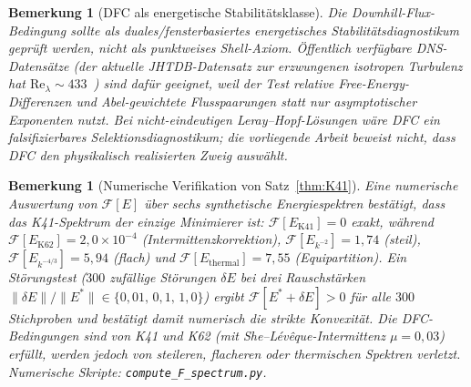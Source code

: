 \documentclass[12pt,a4paper]{article}
\theoremstyle{breakdef}
\theoremstyle{breakplain}
\theoremstyle{breakdef}
\newtheorem{remark}[definition]{Bemerkung}
\begin{document}
\begin{remark}[DFC als energetische Stabilitätsklasse]\label{rem:dfc-stability}
Die Downhill-Flux-Bedingung sollte als duales/fensterbasiertes
energetisches Stabilitätsdiagnostikum geprüft werden, nicht als
punktweises Shell-Axiom. Öffentlich verfügbare DNS-Datensätze (der aktuelle
JHTDB-Datensatz zur erzwungenen isotropen Turbulenz hat
$\mathrm{Re}_\lambda \sim 433$~\cite{JHTDB08,JHTDBForcedIsotropic}) sind dafür geeignet, weil der Test relative
Free-Energy-Differenzen und Abel-gewichtete Flusspaarungen statt nur
asymptotischer Exponenten nutzt. Bei nicht-eindeutigen Leray--Hopf-Lösungen
wäre DFC ein falsifizierbares Selektionsdiagnostikum; die vorliegende Arbeit beweist
nicht, dass DFC den physikalisch realisierten Zweig auswählt.
\end{remark}

\begin{remark}[Numerische Verifikation von Satz~\ref{thm:K41}]\label{rem:numerical-F}
Eine numerische Auswertung von $\mathcal{F}[E]$ über sechs synthetische Energiespektren bestätigt, dass das K41-Spektrum der einzige Minimierer ist: $\mathcal{F}[E_{\mathrm{K41}}] = 0$ exakt, während $\mathcal{F}[E_{\mathrm{K62}}] = 2{,}0 \times 10^{-4}$ (Intermittenzkorrektion), $\mathcal{F}[E_{k^{-2}}] = 1{,}74$ (steil), $\mathcal{F}[E_{k^{-4/3}}] = 5{,}94$ (flach) und $\mathcal{F}[E_{\mathrm{thermal}}] = 7{,}55$ (Equipartition). Ein Störungstest ($300$ zufällige Störungen $\delta E$ bei drei Rauschstärken $\|\delta E\|/\|E^*\| \in \{0{,}01,\, 0{,}1,\, 1{,}0\}$) ergibt $\mathcal{F}[E^* + \delta E] > 0$ für \emph{alle} $300$ Stichproben und bestätigt damit numerisch die strikte Konvexität. Die DFC-Bedingungen sind von K41 und K62 (mit She--Lévêque-Intermittenz $\mu = 0{,}03$) erfüllt, werden jedoch von steileren, flacheren oder thermischen Spektren verletzt. Numerische Skripte: \texttt{compute\_F\_spectrum.py}.
\end{remark}
\end{document}
